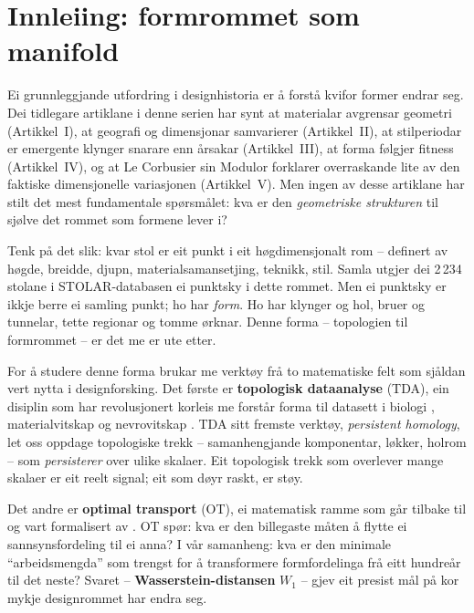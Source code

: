 \documentclass[10pt, a4paper, twocolumn]{article}
\begin{document}
\section{Innleiing: formrommet som manifold}
\label{sec:innleiing}

Ei grunnleggjande utfordring i designhistoria er \aa{} forst\aa{} kvifor former endrar seg. Dei tidlegare artiklane i denne serien har synt at materialar avgrensar geometri (Artikkel~I), at geografi og dimensjonar samvarierer (Artikkel~II), at stilperiodar er emergente klynger snarare enn \aa rsakar (Artikkel~III), at forma f\o lgjer fitness (Artikkel~IV), og at Le Corbusier sin Modulor forklarer overraskande lite av den faktiske dimensjonelle variasjonen (Artikkel~V). Men ingen av desse artiklane har stilt det mest fundamentale sp\o rsm\aa let: kva er den \emph{geometriske strukturen} til sj\o lve det rommet som formene lever i?

Tenk p\aa{} det slik: kvar stol er eit punkt i eit h\o gdimensjonalt rom -- definert av h\o gde, breidde, djupn, materialsamansetjing, teknikk, stil. Samla utgjer dei 2\,234 stolane i STOLAR-databasen ei punktsky i dette rommet. Men ei punktsky er ikkje berre ei samling punkt; ho har \emph{form}. Ho har klynger og hol, bruer og tunnelar, tette regionar og tomme \o rknar. Denne forma -- topologien til formrommet -- er det me er ute etter.

For \aa{} studere denne forma brukar me verkt\o y fr\aa{} to matematiske felt som sj\aa ldan vert nytta i designforsking. Det f\o rste er \textbf{topologisk dataanalyse} (TDA), ein disiplin som har revolusjonert korleis me forst\aa r forma til datasett i biologi \citep{Carlsson2009}, materialvitskap \citep{Hiraoka2016} og nevrovitskap \citep{Giusti2015}. TDA sitt fremste verkt\o y, \emph{persistent homology}, let oss oppdage topologiske trekk -- samanhengjande komponentar, l\o kker, holrom -- som \emph{persisterer} over ulike skalaer. Eit topologisk trekk som overlever mange skalaer er eit reelt signal; eit som d\o yr raskt, er st\o y.

Det andre er \textbf{optimal transport} (OT), ei matematisk ramme som g\aa r tilbake til \citet{Monge1781} og vart formalisert av \citet{Kantorovich1942}. OT sp\o r: kva er den billegaste m\aa ten \aa{} flytte ei sannsynsfordeling til ei anna? I v\aa r samanheng: kva er den minimale ``arbeidsmengda'' som trengst for \aa{} transformere formfordelinga fr\aa{} eitt hundre\aa r til det neste? Svaret -- \textbf{Wasserstein-distansen} $W_1$ -- gjev eit presist m\aa l p\aa{} kor mykje designrommet har endra seg.
\end{document}

